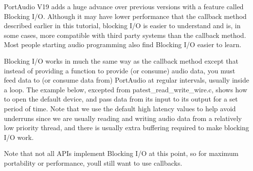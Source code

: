 Port\+Audio V19 adds a huge advance over previous versions with a feature called Blocking I/O. Although it may have lower performance that the callback method described earlier in this tutorial, blocking I/O is easier to understand and is, in some cases, more compatible with third party systems than the callback method. Most people starting audio programming also find Blocking I/O easier to learn.

Blocking I/O works in much the same way as the callback method except that instead of providing a function to provide (or consume) audio data, you must feed data to (or consume data from) Port\+Audio at regular intervals, usually inside a loop. The example below, excepted from patest\+\_\+read\+\_\+write\+\_\+wire.\+c, shows how to open the default device, and pass data from its input to its output for a set period of time. Note that we use the default high latency values to help avoid underruns since we are usually reading and writing audio data from a relatively low priority thread, and there is usually extra buffering required to make blocking I/O work.

Note that not all API\textquotesingle{}s implement Blocking I/O at this point, so for maximum portability or performance, you\textquotesingle{}ll still want to use callbacks.


